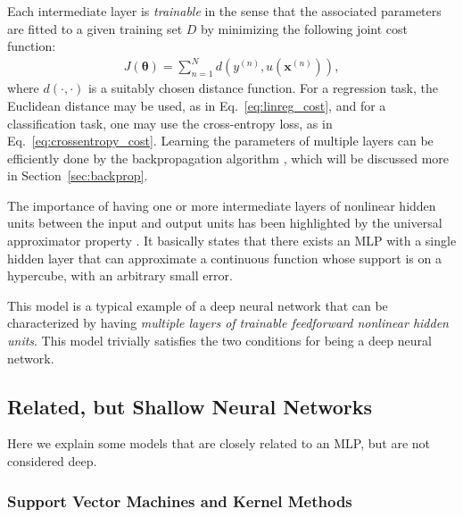 \documentclass[dissertation,nocontribution,draft*]{aaltoseries}
\newcommand{\vect}[1]{\mathbf{#1}}
\newcommand{\vects}[1]{\boldsymbol{#1}}
\newcommand{\vx}[0]{\vect{x}}
\newcommand{\TT}[0]{{\vects{\theta}}}
\begin{document}
Each intermediate layer is \textit{trainable} in the sense
that the associated parameters are fitted to a given
training set $D$ by minimizing the following joint cost
function:
\begin{align}
    \label{eq:mlp_cost}
    J(\TT) = \sum_{n=1}^N d\left(y^{(n)}, u(\vx^{(n)})\right),
\end{align}
where $d(\cdot, \cdot)$ is a suitably chosen distance
function. For a regression task, the Euclidean distance may be
used, as in Eq.~\eqref{eq:linreg_cost}, and for a
classification task, one may use the cross-entropy loss, as in
Eq.~\eqref{eq:crossentropy_cost}. Learning the parameters of
multiple layers can be efficiently done by the backpropagation
algorithm \citep{Rumelhart1986}, which will be discussed more
in Section~\ref{sec:backprop}.

The importance of having one or more intermediate layers of
nonlinear hidden units between the input and output units
has been highlighted by the universal approximator property
\citep{Cybenko1989,Hornik1989}. It basically states that
there exists an MLP with a single hidden layer that can
approximate a continuous function whose support is on a
hypercube, with an arbitrary small error.


This model is a typical example of a deep neural network
that can be characterized by having \textit{multiple layers
of trainable feedforward nonlinear hidden units}. This
model trivially satisfies the two conditions for being a
deep neural network.

\subsection{Related, but Shallow Neural Networks}

Here we explain some models that are closely related to an
MLP, but are not considered deep.

\subsubsection{Support Vector Machines and Kernel Methods}
\label{sec:svm}
\end{document}
